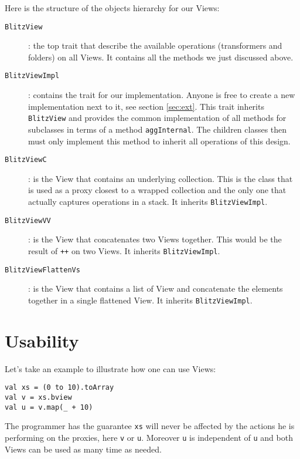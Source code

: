 \documentclass[a4paper,12pt,twocolumn]{article}
\begin{document}
Here is the structure of the objects hierarchy for our Views:
\begin{description}
    \item[{\tt BlitzView}]: the top trait that describe the available operations (transformers and folders) on all Views.
        It contains all the methods we just discussed above.
    \item[{\tt BlitzViewImpl}]: contains the trait for our implementation.
        Anyone is free to create a new implementation next to it, see section \ref{sec:ext}.
        This trait inherits \verb|BlitzView| and provides the common implementation of all methods for subclasses in terms of a method \verb|aggInternal|.
        The children classes then must only implement this method to inherit all operations of this design.
    \item[{\tt BlitzViewC}]: is the View that contains an underlying collection.
        This is the class that is used as a proxy closest to a wrapped collection and the only one that actually captures operations in a stack.
        It inherits \verb|BlitzViewImpl|.
    \item[{\tt BlitzViewVV}]: is the View that concatenates two Views together.
        This would be the result of \verb|++| on two Views.
        It inherits \verb|BlitzViewImpl|.
    \item[{\tt BlitzViewFlattenVs}]: is the View that contains a list of View and concatenate the elements together in a single flattened View.
        It inherits \verb|BlitzViewImpl|.
\end{description}


\section{Usability}

Let's take an example to illustrate how one can use Views:

\begin{lstlisting}
val xs = (0 to 10).toArray
val v = xs.bview
val u = v.map(_ + 10)
\end{lstlisting}

The programmer has the guarantee \verb|xs| will never be affected by the actions he is performing on the proxies, here \verb|v| or \verb|u|.
Moreover \verb|u| is independent of \verb|u| and both Views can be used as many time as needed.
\end{document}

